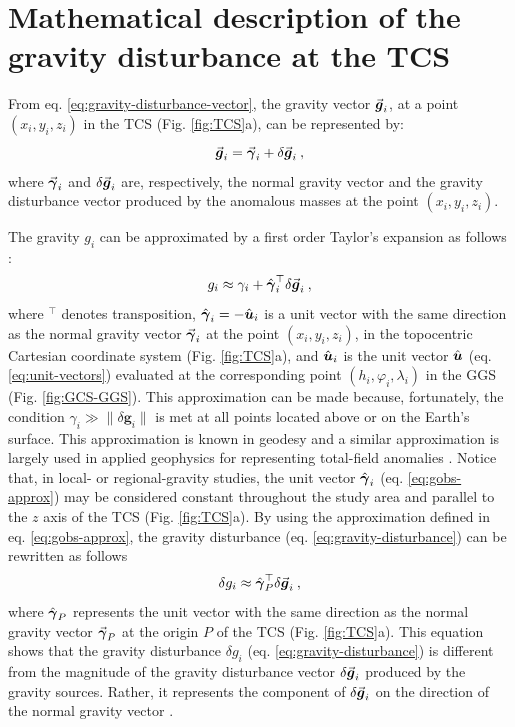 \documentclass[extra]{gji}
\newcommand{\versor}[1]{\hat{\mitbf{#1}}}
\renewcommand{\vector}[1]{\vec{\mitbf{#1}}}
\begin{document}
\section{Mathematical description of the gravity disturbance at the TCS}

From eq. \ref{eq:gravity-disturbance-vector}, the gravity vector $\vector{g}_{i}$, at a point
$(x_{i}, y_{i}, z_{i})$ in the TCS (Fig. \ref{fig:TCS}a), can be represented by:
\begin{equation}
\vector{g}_{i} = \vector{\gamma}_{i} + \delta \vector{g}_{i} \: ,
\label{eq:gravity-vector-TCS}
\end{equation}
where $\vector{\gamma}_{i}$ and $\delta \vector{g}_{i}$
are, respectively, the normal gravity vector and the
gravity disturbance vector produced by the anomalous
masses at the point $(x_{i}, y_{i}, z_{i})$.

The gravity $g_{i}$ can be approximated by a first order Taylor's
expansion as follows \citep{sanso_sideris2013}:
\begin{equation}
g_{i} \approx \gamma_{i} +
\versor{\gamma}_{i}^{\top} \delta \vector{g}_{i} \: ,
\label{eq:gobs-approx}
\end{equation}
where $^{\top}$ denotes transposition,
$\versor{\gamma}_{i} = -\versor{u}_{i}$ is a unit
vector with the same direction as the normal gravity vector
$\vector{\gamma}_{i}$ at the point $(x_{i}, y_{i}, z_{i})$, in the
topocentric Cartesian coordinate system (Fig. \ref{fig:TCS}a), and
$\versor{u}_{i}$ is the unit vector $\versor{u}$
(eq. \ref{eq:unit-vectors}) evaluated at the corresponding
point $(h_{i}, \varphi_{i}, \lambda_{i})$ in the
GGS (Fig. \ref{fig:GCS-GGS}).
This approximation can be made because, fortunately,
the condition $\gamma_{i} \gg \| \delta \mathbf{g}_{i} \|$
is met at all points located above or on the Earth's surface.
This approximation is known in geodesy \citep[e.g.,][]{sanso_sideris2013}
and a similar approximation is largely used in applied geophysics
for representing total-field anomalies \citep[e.g.,][]{blakely1996}.
Notice that, in local- or regional-gravity studies, the unit
vector $\versor{\gamma}_{i}$ (eq. \ref{eq:gobs-approx})
may be considered constant throughout the study area and
parallel to the $z$ axis of the TCS (Fig. \ref{fig:TCS}a).
By using the approximation defined in eq.
\ref{eq:gobs-approx}, the gravity disturbance
(eq. \ref{eq:gravity-disturbance}) can be rewritten as
follows
\begin{equation}
\delta g_{i} \approx \versor{\gamma}_{P}^{\top} \delta \vector{g}_{i} \: ,
\label{eq:gravity-disturbance-approx-TCS}
\end{equation}
where $\versor{\gamma}_{P}$ represents the unit vector with
the same direction as the normal gravity vector $\vector{\gamma}_{P}$
at the origin $P$ of the TCS (Fig. \ref{fig:TCS}a).
This equation shows that the gravity disturbance $\delta g_{i}$ (eq. \ref{eq:gravity-disturbance}) is different from the magnitude
of the gravity disturbance vector $\delta \vector{g}_{i}$
produced by the gravity sources. Rather, it represents the
component of $\delta \vector{g}_{i}$ on the direction of the normal
gravity vector \citep{hofmann-wellenhof-moritz2005, sanso_sideris2013}.
\end{document}
